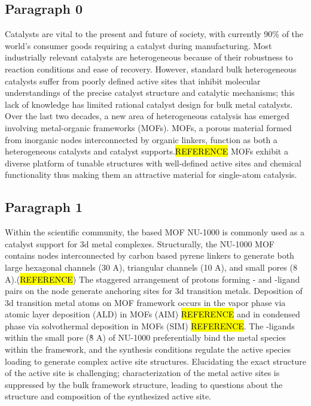 \documentclass[journal=jctcce,manuscript=article]{achemso}
\begin{document}
\subsection{Paragraph 0}
 Catalysts are vital to the present and future of society, with currently 90\% of the world's consumer goods requiring a catalyst during manufacturing.\cite{Hagen2015} Most industrially relevant catalysts are heterogeneous because of their robustness to reaction conditions and ease of recovery. However, standard bulk heterogeneous catalysts suffer from poorly defined active sites that inhibit molecular understandings of the precise catalyst structure and catalytic mechanisms; this lack of knowledge has limited rational catalyst design for bulk metal catalysts. Over the last two decades, a new area of heterogeneous catalysis has emerged involving metal-organic frameworks (MOFs). MOFs, a porous material formed from inorganic nodes interconnected by organic linkers, function as both a heterogeneous catalysts and catalyst supports.\hl{REFERENCE} MOFs exhibit a diverse platform of tunable structures with well-defined active sites and chemical functionality thus making them an attractive material for single-atom catalysis. 

\subsection{Paragraph 1}
Within the scientific community, the  based MOF NU-1000 is commonly used as a catalyst support for 3d metal complexes. Structurally, the NU-1000 MOF contains  nodes interconnected by carbon based pyrene linkers to generate both large hexagonal channels (30 A), triangular channels (10 A), and small pores (8 A).(\hl{REFERENCE}) The staggered arrangement of protons forming - and -ligand pairs on the node generate anchoring sites for 3d transition metals.\cite{Planas2014} Deposition of 3d transition metal atoms on MOF framework occurs in the vapor phase via atomic layer deposition (ALD) in MOFs (AIM) \hl{REFERENCE} and in condensed phase via solvothermal deposition in MOFs (SIM) \hl{REFERENCE}. The -ligands within the small pore (\~8 A) of NU-1000 preferentially bind the metal species within the framework,\cite{Gallington2016,Rimoldi2017} and the synthesis conditions regulate the active species loading to generate complex active site structures.\cite{Kim2015} Elucidating the exact structure of the active site is challenging; characterization of the metal active sites is suppressed by the bulk framework structure, leading to questions about the structure and composition of the synthesized active site.
\end{document}
